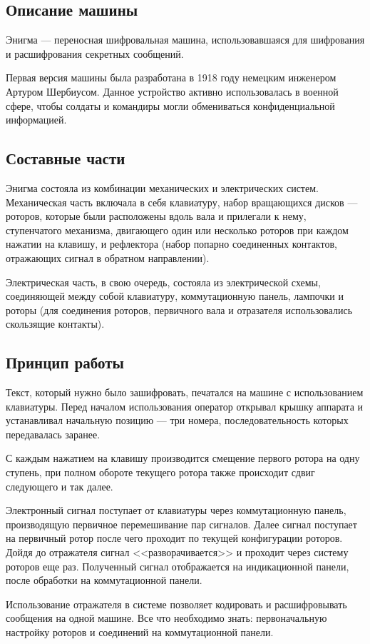 
\vspace{-1\baselineskip}

\subsection{Описание машины}

Энигма --- переносная шифровальная машина, использовавшаяся для шифрования и
расшифрования секретных сообщений.

Первая версия машины была разработана в 1918 году немецким инженером
Артуром Шербиусом. Данное устройство активно использовалась в военной сфере,
чтобы солдаты и командиры могли обмениваться конфиденциальной информацией.

\subsection{Составные части}

Энигма состояла из комбинации механических и электрических систем.
Механическая часть включала в себя клавиатуру, набор вращающихся
дисков --- роторов, которые были расположены вдоль вала и прилегали к нему,
ступенчатого механизма, двигающего один или несколько роторов при каждом
нажатии на клавишу, и рефлектора (набор попарно соединенных контактов,
отражающих сигнал в обратном направлении).

Электрическая часть, в свою очередь, состояла из электрической схемы,
соединяющей между собой клавиатуру, коммутационную панель, лампочки и роторы
(для соединения роторов, первичного вала и отразателя использовались скользящие
контакты).

\subsection{Принцип работы}

Текст, который нужно было зашифровать, печатался на машине с использованием
клавиатуры. Перед началом использования оператор открывал крышку аппарата и
устанавливал начальную позицию --- три номера, последовательность которых
передавалась заранее.

С каждым нажатием на клавишу производится смещение первого ротора на одну
ступень, при полном обороте текущего ротора также происходит сдвиг
следующего и так далее.

Электронный сигнал поступает от клавиатуры через коммутационную панель,
производящую первичное перемешивание пар сигналов. Далее сигнал поступает на
первичный ротор после чего проходит по текущей конфигурации роторов. Дойдя до
отражателя сигнал <<разворачивается>> и проходит через систему роторов еще
раз. Полученный сигнал отображается на индикационной панели, после обработки
на коммутационной панели.

Использование отражателя в системе позволяет кодировать и расшифровывать
сообщения на одной машине. Все что необходимо знать: первоначальную настройку
роторов и соединений на коммутационной панели.

